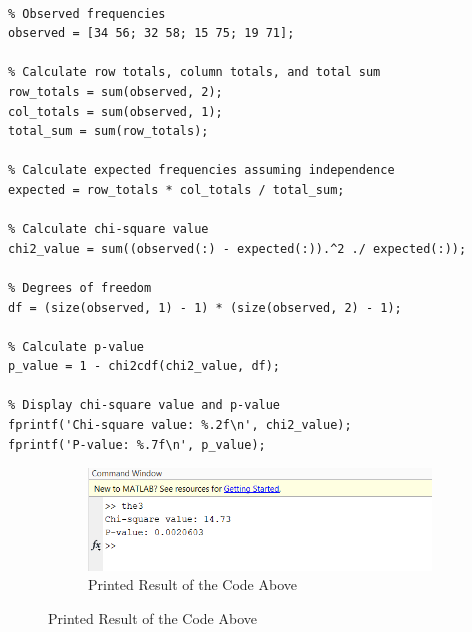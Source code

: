 \documentclass[12pt]{article}
\begin{document}
\begin{lstlisting}[style=Matlab-editor]

% Observed frequencies
observed = [34 56; 32 58; 15 75; 19 71];

% Calculate row totals, column totals, and total sum
row_totals = sum(observed, 2);
col_totals = sum(observed, 1);
total_sum = sum(row_totals);

% Calculate expected frequencies assuming independence
expected = row_totals * col_totals / total_sum;

% Calculate chi-square value
chi2_value = sum((observed(:) - expected(:)).^2 ./ expected(:));

% Degrees of freedom
df = (size(observed, 1) - 1) * (size(observed, 2) - 1);

% Calculate p-value
p_value = 1 - chi2cdf(chi2_value, df);

% Display chi-square value and p-value
fprintf('Chi-square value: %.2f\n', chi2_value);
fprintf('P-value: %.7f\n', p_value);

\end{lstlisting}

\begin{figure}[H]
  \centering
  \begin{subfigure}[b]{0.4\linewidth}
    \includegraphics[width=\linewidth]{Screenshot (1885).png}
    \caption*{Printed Result of the Code Above}
  \end{subfigure}
\end{figure}
\end{document}
